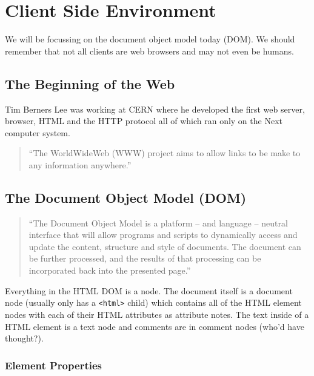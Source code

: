\section{Client Side Environment}\label{sec:client_side_environment}

We will be focussing on the document object model today (DOM).
We should remember that not all clients are web browsers and may not even be humans.

\subsection{The Beginning of the Web}\label{sub:the_beginning_of_the_web}

Tim Berners Lee was working at CERN where he developed the first web server, browser, HTML and the HTTP protocol all of which ran only on the Next computer system.

\begin{quote}
	``The WorldWideWeb (WWW) project aims to allow links to be make to any information anywhere.''
\end{quote}

\subsection{The Document Object Model (DOM)}\label{sub:the_document_object_model_dom_}

\begin{quote}
	``The Document Object Model is a platform -- and language -- neutral interface that will allow programs and scripts to dynamically access and update the content, structure and style of documents.
	The document can be further processed, and the results of that processing can be incorporated back into the presented page.''
\end{quote}
Everything in the HTML DOM is a node.
The document itself is a document node (usually only has a \texttt{<html>} child) which contains all of the HTML element nodes with each of their HTML attributes as attribute notes.
The text inside of a HTML element is a text node and comments are in comment nodes (who'd have thought?).

\subsubsection{Element Properties}\label{ssub:element_properties}

